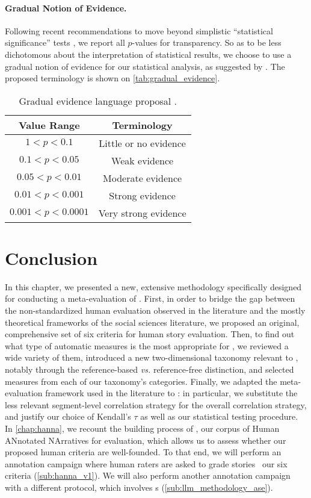 \paragraph{Gradual Notion of Evidence.}
Following recent recommendations to move beyond simplistic ``statistical significance'' tests \citep{amrhein2019scientists, wasserstein2019moving, mcshane2019abandon}, we report all $p$-values for transparency. So as to be less dichotomous about the interpretation of statistical results, we choose to use a gradual notion of evidence for our statistical analysis, as suggested by \citet{muff2022rewriting}. The proposed terminology is shown on \autoref{tab:gradual_evidence}.

\begin{table}[h]
\centering
\begin{tabular}{cc}
\toprule
\textbf{Value Range} & \textbf{Terminology} \\
\midrule
$1 < p < 0.1$ & Little or no evidence \\
$0.1 < p < 0.05$ & Weak evidence \\
$0.05 < p < 0.01$ & Moderate evidence \\
$0.01 < p < 0.001$ & Strong evidence \\
$0.001 < p < 0.0001$ & Very strong evidence \\
\bottomrule
\end{tabular}
\caption{Gradual evidence language proposal \citep{muff2022rewriting}.}
\label{tab:gradual_evidence}
\end{table}

\section{Conclusion}

In this chapter, we presented a new, extensive methodology specifically designed for conducting a meta-evaluation of {\asgfull}. First, in order to bridge the gap between the non-standardized human evaluation observed in the {\nlp} literature and the mostly theoretical frameworks of the social sciences literature, we proposed an original, comprehensive set of six criteria for human story evaluation. Then, to find out what type of automatic measures is the most appropriate for {\asefull}, we reviewed a wide variety of them, introduced a new two-dimensional taxonomy relevant to {\asg}, notably through the reference-based \emph{vs.} reference-free distinction, and selected measures from each of our taxonomy's categories. Finally, we adapted the meta-evaluation framework used in the {\nlp} literature to {\asg}: in particular, we substitute the less relevant segment-level correlation strategy for the overall correlation strategy, and justify our choice of Kendall's $\tau$ as well as our statistical testing procedure. In \autoref{chap:hanna}, we recount the building process of {\hanna}, our corpus of Human ANnotated NArratives for {\asg} evaluation, which allows us to assess whether our proposed human criteria are well-founded. To that end, we will perform an annotation campaign where human raters are asked to grade stories {\wrt}\ our six criteria (\autoref{sub:hanna_v1}). We will also perform another annotation campaign with a different protocol, which involves {\llmfull}s  (\autoref{sub:llm_methodology_ase}).